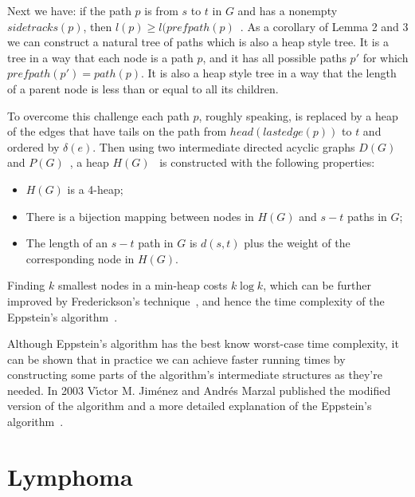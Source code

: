 Next we have: if the path $p$ is from $s$ to $t$ in $G$ and has a nonempty $sidetracks(p)$, then $l(p) \geq l(prefpath(p)$~\cite[Lemma 3]{eppstein1998finding}. As a corollary of Lemma 2 and 3 we can construct a natural tree of paths which is also a heap style tree. It is a tree in a way that each node is a path $p$, and it has all possible paths $p'$ for which $prefpath(p') = path(p)$. It is also a heap style tree in a way that the length of a parent node is less than or equal to all its children.

To overcome this challenge each path $p$, roughly speaking, is replaced by a heap of the edges that have tails on the path from $head(lastedge(p))$ to $t$ and ordered by $\delta(e)$. Then using two intermediate directed acyclic graphs $D(G)$~\cite[Lemma 4]{eppstein1998finding} and $P(G)$~\cite[Lemma 5]{eppstein1998finding}, a heap $H(G)$~\cite[Lemma 6]{eppstein1998finding} is constructed with the following properties:
\begin{itemize}
\item $H(G)$ is a 4-heap;
\item There is a bijection mapping between nodes in $H(G)$ and $s-t$ paths in $G$;
\item The length of an $s-t$ path in $G$ is $d(s,t)$ plus the weight of the corresponding node in $H(G)$.
\end{itemize}

Finding $k$ smallest nodes in a min-heap costs $k\log k$, which can be further improved by Frederickson's technique~\cite{frederickson1993optimal}, and hence the time complexity of the Eppstein's algorithm~\cite[Lemma 7]{eppstein1998finding}.

Although Eppstein's algorithm has the best know worst-case time complexity, it can be shown that in practice we can achieve faster running times by constructing some parts of the algorithm's intermediate structures as they're needed. In 2003 V{\'\i}ctor M. Jim{\'e}nez and Andr{\'e}s Marzal published the modified version of the algorithm and a more detailed explanation of the Eppstein's algorithm~\cite{jimenez2003lazy}.
\section{Lymphoma}
